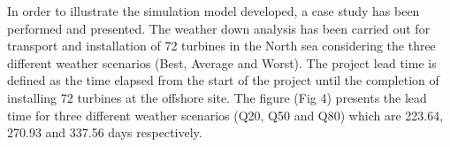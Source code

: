In order to illustrate the simulation model developed, a case study has been performed and presented. The weather down analysis has been carried out for transport and installation of 72 turbines in the North sea considering the three different weather scenarios (Best, Average and Worst). The project lead time is defined as the time elapsed from the start of the project until the completion of installing 72 turbines at the offshore site. The figure (Fig 4) presents the lead time for three different weather scenarios (Q20, Q50 and Q80) which are 223.64, 270.93 and 337.56 days respectively. 

